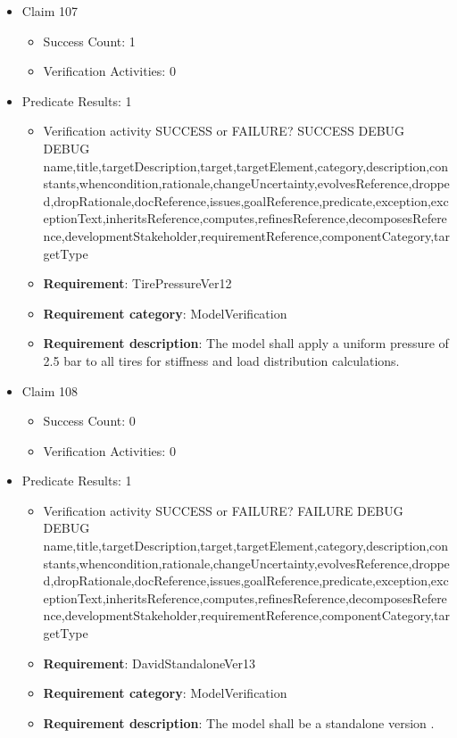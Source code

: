 \documentclass{article}
\begin{document}
\begin{itemize}
  				  \item Claim 107
				\begin{itemize}
			    	\item Success Count: 1 
			    	\item Verification Activities: 0
				\end{itemize}
				
									    
				\item Predicate Results: 1
					\begin{itemize}				
					\item Verification activity SUCCESS or FAILURE? SUCCESS
					DEBUG DEBUG name,title,targetDescription,target,targetElement,category,description,constants,whencondition,rationale,changeUncertainty,evolvesReference,dropped,dropRationale,docReference,issues,goalReference,predicate,exception,exceptionText,inheritsReference,computes,refinesReference,decomposesReference,developmentStakeholder,requirementReference,componentCategory,targetType
					\item \textbf{Requirement}: TirePressureVer12 
					\item \textbf{Requirement category}: ModelVerification
					\item \textbf{Requirement description}: The model shall apply a uniform pressure of 2.5 bar to all tires for stiffness and load distribution calculations.
					\end{itemize}

  				  \item Claim 108
				\begin{itemize}
			    	\item Success Count: 0 
			    	\item Verification Activities: 0
				\end{itemize}
				
									    
				\item Predicate Results: 1
					\begin{itemize}				
					\item Verification activity SUCCESS or FAILURE? FAILURE
					DEBUG DEBUG name,title,targetDescription,target,targetElement,category,description,constants,whencondition,rationale,changeUncertainty,evolvesReference,dropped,dropRationale,docReference,issues,goalReference,predicate,exception,exceptionText,inheritsReference,computes,refinesReference,decomposesReference,developmentStakeholder,requirementReference,componentCategory,targetType
					\item \textbf{Requirement}: DavidStandaloneVer13 
					\item \textbf{Requirement category}: ModelVerification
					\item \textbf{Requirement description}: The model shall be a standalone version .
					\end{itemize}


\end{itemize}
\end{document}
